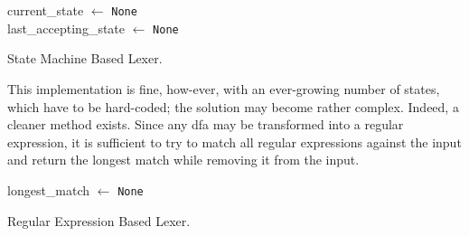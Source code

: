 \begingroup
\vspace{1.5em}
\begin{algorithm}[H]
\setlength{\algomargin}{1.5em}
current\_state $\gets$ \texttt{None}\\
last\_accepting\_state $\gets$ \texttt{None}

    


\caption{State Machine Based Lexer.}
\label{alg:lexer-state-based}
\end{algorithm}
\vspace{1.5em}
\endgroup

This implementation is fine, how-ever, with an ever-growing number of states, which have to be hard-coded; the solution may become rather complex. Indeed, a cleaner method exists. Since any \gls{dfa} may be transformed into a regular expression, it is sufficient to try to match all regular expressions against the input and return the longest match while removing it from the input. 


\begingroup
\vspace{1.5em}
\begin{algorithm}[H]
\setlength{\algomargin}{1.5em}
longest\_match $\gets$ \texttt{None}\\


    


\caption{Regular Expression Based Lexer.}
\label{alg:lexer-expression-based}
\end{algorithm}
\vspace{1.5em}
\endgroup

